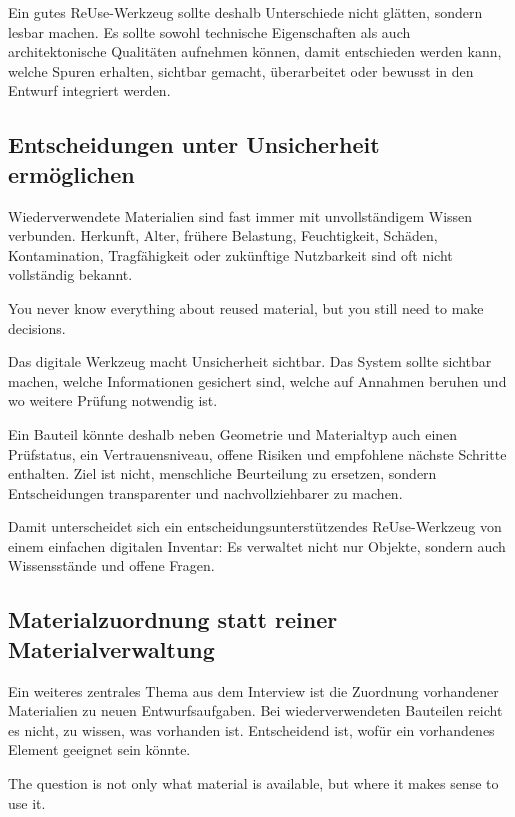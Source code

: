 Ein gutes ReUse-Werkzeug sollte deshalb Unterschiede nicht glätten, sondern lesbar machen. Es sollte sowohl technische Eigenschaften als auch architektonische Qualitäten aufnehmen können, damit entschieden werden kann, welche Spuren erhalten, sichtbar gemacht, überarbeitet oder bewusst in den Entwurf integriert werden.

\subsection{Entscheidungen unter Unsicherheit ermöglichen}

Wiederverwendete Materialien sind fast immer mit unvollständigem Wissen verbunden. Herkunft, Alter, frühere Belastung, Feuchtigkeit, Schäden, Kontamination, Tragfähigkeit oder zukünftige Nutzbarkeit sind oft nicht vollständig bekannt.

\begin{Blockquote}
You never know everything about reused material, but you still need to make decisions.
\end{Blockquote}

Das digitale Werkzeug macht Unsicherheit sichtbar. Das System sollte sichtbar machen, welche Informationen gesichert sind, welche auf Annahmen beruhen und wo weitere Prüfung notwendig ist.

Ein Bauteil könnte deshalb neben Geometrie und Materialtyp auch einen Prüfstatus, ein Vertrauensniveau, offene Risiken und empfohlene nächste Schritte enthalten. Ziel ist nicht, menschliche Beurteilung zu ersetzen, sondern Entscheidungen transparenter und nachvollziehbarer zu machen.

Damit unterscheidet sich ein entscheidungsunterstützendes ReUse-Werkzeug von einem einfachen digitalen Inventar: Es verwaltet nicht nur Objekte, sondern auch Wissensstände und offene Fragen.

\subsection{Materialzuordnung statt reiner Materialverwaltung}

Ein weiteres zentrales Thema aus dem Interview ist die Zuordnung vorhandener Materialien zu neuen Entwurfsaufgaben. Bei wiederverwendeten Bauteilen reicht es nicht, zu wissen, was vorhanden ist. Entscheidend ist, wofür ein vorhandenes Element geeignet sein könnte.

\begin{Blockquote}
The question is not only what material is available, but where it makes sense to use it.
\end{Blockquote}

